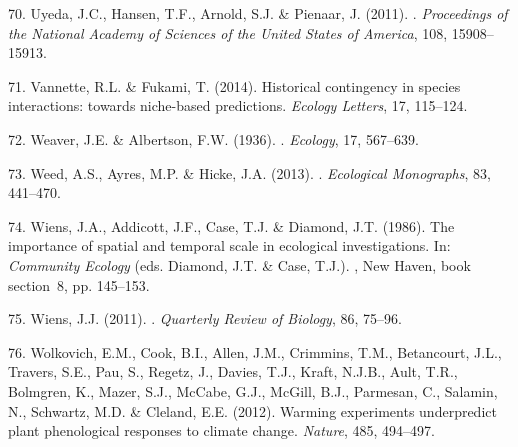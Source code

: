 \documentclass[11pt,a4paper,oneside]{article}
\begin{document}
\begin{thebibliography}{79}
70. Uyeda, J.C., Hansen, T.F., Arnold, S.J. \& Pienaar, J. ({2011}).
.
\newblock \emph{Proceedings of the National Academy of Sciences of the United
  States of America}, {108}, {15908--15913}.

71. Vannette, R.L. \& Fukami, T. (2014).
\newblock Historical contingency in species interactions: towards niche-based
  predictions.
\newblock \emph{Ecology Letters}, 17, 115--124.

72. Weaver, J.E. \& Albertson, F.W. (1936).
.
\newblock \emph{Ecology}, 17, 567--639.

73. Weed, A.S., Ayres, M.P. \& Hicke, J.A. (2013).
.
\newblock \emph{Ecological Monographs}, 83, 441--470.

74. Wiens, J.A., Addicott, J.F., Case, T.J. \& Diamond, J.T. (1986).
\newblock The importance of spatial and temporal scale in ecological
  investigations.
\newblock In: \emph{Community Ecology} (eds. Diamond, J.T. \& Case, T.J.).
, New Haven, book section~8, pp. 145--153.

75. Wiens, J.J. (2011).
.
\newblock \emph{Quarterly Review of Biology}, 86, 75--96.

76. Wolkovich, E.M., Cook, B.I., Allen, J.M., Crimmins, T.M., Betancourt, J.L.,
  Travers, S.E., Pau, S., Regetz, J., Davies, T.J., Kraft, N.J.B., Ault, T.R.,
  Bolmgren, K., Mazer, S.J., McCabe, G.J., McGill, B.J., Parmesan, C., Salamin,
  N., Schwartz, M.D. \& Cleland, E.E. (2012).
\newblock Warming experiments underpredict plant phenological responses to
  climate change.
\newblock \emph{Nature}, 485, 494--497.


\end{thebibliography}
\end{document}
